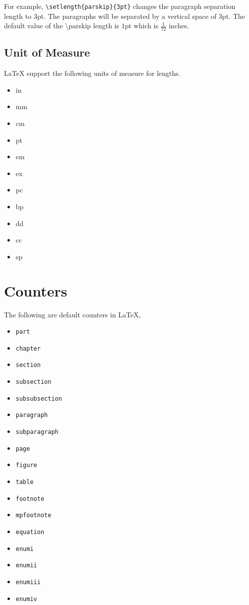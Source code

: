 \documentclass{article}
\theoremstyle{definition}
\theoremstyle{remark}
\begin{document}
For example, \texttt{\textbackslash setlength\{parskip\}\{3pt\}} changes the paragraph separation length to $3$pt. The paragraphs will be separated by a vertical space of $3$pt. The default value of the \textbackslash parskip length is $1$pt which is $\frac{1}{72}$ inches.

\subsection{Unit of Measure}
	\LaTeX{} support the following units of measure for lengths.
\begin{multicols}{6}
\begin{itemize}
	\item in
	\item mm
	\item cm
	\item pt
	\item em
	\item ex
	\item pc
	\item bp
	\item dd
	\item cc
	\item sp
\end{itemize}
\end{multicols}

\section{Counters}
	The following are default counters in \LaTeX{}, 
\begin{multicols}{3}
\begin{itemize}
	\item \texttt{part}
	\item \texttt{chapter}
	\item \texttt{section} 
	\item \texttt{subsection}
	\item \texttt{subsubsection}
	\item \texttt{paragraph}
	\item \texttt{subparagraph}
	\item \texttt{page}
	\item \texttt{figure}
	\item \texttt{table}
	\item \texttt{footnote}
	\item \texttt{mpfootnote}
	\item \texttt{equation}
	\item \texttt{enumi}
	\item \texttt{enumii}
	\item \texttt{enumiii}
	\item \texttt{enumiv}
\end{itemize}
\end{multicols}
\end{document}
